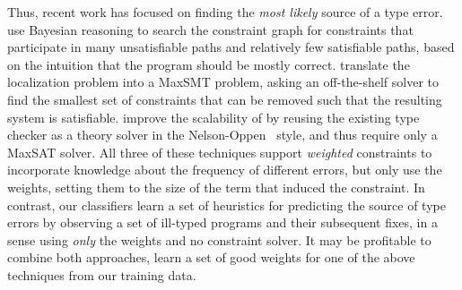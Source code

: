 Thus, recent work has focused on finding the \emph{most likely} source
of a type error.
%
\citet{Zhang2014-lv} use Bayesian reasoning to search the constraint
graph for constraints that participate in many unsatisfiable paths and
relatively few satisfiable paths, based on the intuition that the
program should be mostly correct.
%
\citet{Pavlinovic2014-mr} translate the localization problem into a
MaxSMT problem, asking an off-the-shelf solver to find the smallest
set of constraints that can be removed such that the resulting system is
satisfiable.
%
\citet{Loncaric2016-uk} improve the scalability of
\citeauthor{Pavlinovic2014-mr} by reusing the existing type checker as
a theory solver in the Nelson-Oppen~\citeyear{Nelson1979-td}
style, and thus require only a MaxSAT solver.
%
All three of these techniques support \emph{weighted} constraints to
incorporate knowledge about the frequency of different errors,
but only \citeauthor{Pavlinovic2014-mr} use the weights, setting them to
the size of the term that induced the constraint.
%
In contrast, our classifiers learn a set of heuristics for predicting
the source of type errors by observing a set of ill-typed programs and
their subsequent fixes, in a sense using \emph{only} the weights and no
constraint solver.
%
It may be profitable to combine both approaches, \ie learn a set of good
weights for one of the above techniques from our training data.

